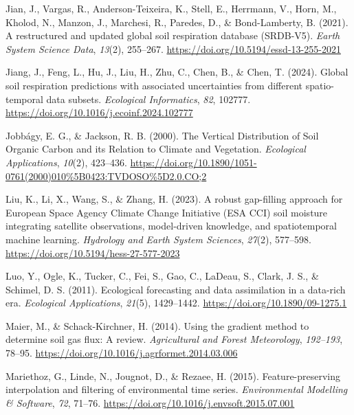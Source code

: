 \documentclass[
  letterpaper,
  DIV=11,
  numbers=noendperiod]{scrartcl}
\newlength{\cslhangindent}
\newenvironment{CSLReferences}[2] %
 {\begin{list}{}{%
  \setlength{\itemindent}{0pt}
  \setlength{\leftmargin}{0pt}
  \setlength{\parsep}{0pt}
  \ifodd #1
   \setlength{\leftmargin}{\cslhangindent}
   \setlength{\itemindent}{-1\cslhangindent}
  \fi
  \setlength{\itemsep}{#2\baselineskip}}}
 {\end{list}}
\begin{document}
\begin{CSLReferences}{1}{0}
Jian, J., Vargas, R., Anderson-Teixeira, K., Stell, E., Herrmann, V.,
Horn, M., Kholod, N., Manzon, J., Marchesi, R., Paredes, D., \&
Bond-Lamberty, B. (2021). A restructured and updated global soil
respiration database ({SRDB-V5}). \emph{Earth System Science Data},
\emph{13}(2), 255--267. \url{https://doi.org/10.5194/essd-13-255-2021}

Jiang, J., Feng, L., Hu, J., Liu, H., Zhu, C., Chen, B., \& Chen, T.
(2024). Global soil respiration predictions with associated
uncertainties from different spatio-temporal data subsets.
\emph{Ecological Informatics}, \emph{82}, 102777.
\url{https://doi.org/10.1016/j.ecoinf.2024.102777}

Jobbágy, E. G., \& Jackson, R. B. (2000). The {Vertical Distribution} of
{Soil Organic Carbon} and its {Relation} to {Climate} and {Vegetation}.
\emph{Ecological Applications}, \emph{10}(2), 423--436.
\url{https://doi.org/10.1890/1051-0761(2000)010\%5B0423:TVDOSO\%5D2.0.CO;2}

Liu, K., Li, X., Wang, S., \& Zhang, H. (2023). A robust gap-filling
approach for {European Space Agency Climate Change Initiative} ({ESA
CCI}) soil moisture integrating satellite observations, model-driven
knowledge, and spatiotemporal machine learning. \emph{Hydrology and
Earth System Sciences}, \emph{27}(2), 577--598.
\url{https://doi.org/10.5194/hess-27-577-2023}

Luo, Y., Ogle, K., Tucker, C., Fei, S., Gao, C., LaDeau, S., Clark, J.
S., \& Schimel, D. S. (2011). Ecological forecasting and data
assimilation in a data-rich era. \emph{Ecological Applications},
\emph{21}(5), 1429--1442. \url{https://doi.org/10.1890/09-1275.1}

Maier, M., \& Schack-Kirchner, H. (2014). Using the gradient method to
determine soil gas flux: {A} review. \emph{Agricultural and Forest
Meteorology}, \emph{192--193}, 78--95.
\url{https://doi.org/10.1016/j.agrformet.2014.03.006}

Mariethoz, G., Linde, N., Jougnot, D., \& Rezaee, H. (2015).
Feature-preserving interpolation and filtering of environmental time
series. \emph{Environmental Modelling \& Software}, \emph{72}, 71--76.
\url{https://doi.org/10.1016/j.envsoft.2015.07.001}


\end{CSLReferences}
\end{document}
